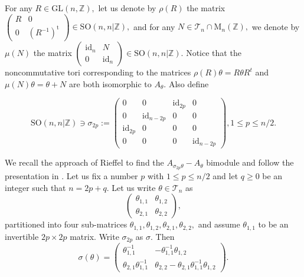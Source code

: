 \documentclass[9pt, BCOR=2mm]{amsart}
\numberwithin{equation}{section}
\numberwithin{equation}{section}
\newcommand{\Z}{{\mathbb{Z}}}
\DeclareMathOperator{\id}{id}
\begin{document}
For any $R \in \mathrm{GL}(n,\Z),$ let us denote by $\rho(R)$ the matrix $\left(\begin{array}{cc}R & 0 \\ 0 & \left(R^{-1}\right)^{\mathrm{t}}\end{array}\right) \in \mathrm{SO}(n, n|\Z) ,$ and for any $N \in \mathcal{T}_{n} \cap \mathrm{M}_{n}(\Z),$ we denote by $\mu(N)$ the matrix $\left(\begin{array}{cc}\id_n & N \\ 0 & \id_n\end{array}\right) \in \mathrm{SO}(n, n|\Z).$
Notice that the noncommutative tori corresponding to the matrices $\rho(R) \theta=R \theta R^{t}$ and $\mu(N) \theta=\theta+N$ are both isomorphic to $A_{\theta}$. Also define

$$\mathrm{SO}(n, n|\Z) \ni \sigma_{2 p}:=\left(\begin{array}{cccc}0 & 0 & \mathrm{id}_{2 p} & 0 \\ 0 & \mathrm{id}_{n-2 p} & 0 & 0 \\ \mathrm{id}_{2 p} & 0 & 0 & 0 \\ 0 & 0 & 0 & \mathrm{id}_{n-2 p}\end{array}\right), 1 \leqslant p \leqslant n / 2.$$
 
 We recall the approach of Rieffel \cite{Rie88} to find the $A_{\sigma_{2 p}\theta}-A_\theta$ bimodule and follow the presentation in \cite{Li04}. Let us fix a number $p$ with $1\leq p\leq n\slash 2$ and let $q\geq0$ be an integer such that $n=2p+q.$ Let us write $\theta\in \mathcal{T}_n$ as
$$\left(\begin{matrix}
                  \theta_{1,1} & \theta_{1,2} \\
                  \theta_{2,1} & \theta_{2,2}
                \end{matrix}
\right),$$
partitioned into four sub-matrices $\theta_{1,1},\theta_{1,2},\theta_{2,1},\theta_{2,2},$ and assume $\theta_{1,1}$ to be an invertible $2p\times 2p$ matrix. Write $\sigma_{2 p}$ as $\sigma$. Then
\begin{equation}\label{eq:defoftheta'}
	\sigma(\theta)=\left(\begin{matrix}
                  \theta_{1,1}^{-1} & -\theta_{1,1}^{-1}\theta_{1,2} \\
                  \theta_{2,1}\theta_{1,1}^{-1} & \theta_{2,2}-\theta_{2,1}\theta_{1,1}^{-1}\theta_{1,2}
                \end{matrix}
\right). \end{equation} 
\end{document}
